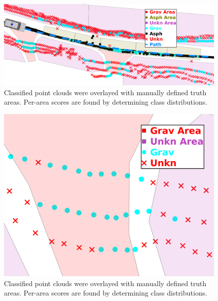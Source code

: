 \documentclass[numbered,pdftex]{ohio-etd}
\begin{document}
{{		 
	
		\begin{figure}[H]
			\centering
			\includegraphics[width=0.95\linewidth]{Defense_Images/classify_with_mca}
			\caption[Classified Point Cloud with Truth Areas]{Classified point clouds were overlayed with manually defined truth areas. Per-area scores are found by determining class distributions.}
			\label{fig:classify_with_mca}
		\end{figure}
		
		\begin{figure}[H]
			\centering
			\includegraphics[width=0.95\linewidth]{Defense_Images/classify_with_mca_closeup}
			\caption[Classified Point Cloud with Truth Areas Closeup]{Classified point clouds were overlayed with manually defined truth areas. Per-area scores are found by determining class distributions.}
			\label{fig:classify_with_mca_closeup}
		\end{figure}
		
}}
\end{document}
